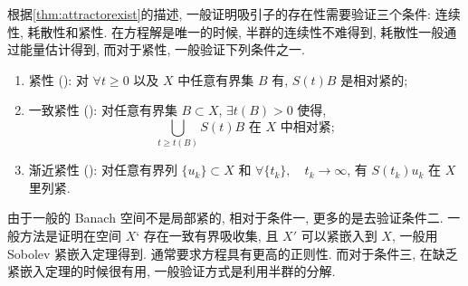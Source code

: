 \documentclass[oneside,longtitle]{LZUthesis}
\numberwithin{equation}{chapter}
\newcommand*\Brace[1]{\lbrace#1\rbrace}
\begin{document}
根据\cref{thm:attractorexist}的描述, 一般证明吸引子的存在性需要验证三个条件:
连续性, 耗散性和紧性. 在方程解是唯一的时候, 半群的连续性不难得到,
耗散性一般通过能量估计得到, 而对于紧性, 一般验证下列条件之一.
\begin{enumerate}[itemindent = -1em]
	\item 紧性 (\citep{temamInfiniteDimensionalDynamicalSystems1997}): 对 $\forall t \geq 0$ 以及 $X$ 中任意有界集 $B$ 有, $S(t)B$ 是相对紧的;
	\item 一致紧性 (\citep{babinAttractorsEvolutionEquations1992a,robinsonInfiniteDimensionalDynamicalSystems2001a}): 对任意有界集 $B \subset X$, $\exists t(B) > 0$ 使得,
	\begin{equation*}
		\bigcup_{t \geq t(B)} S(t)B \text{ 在 } X \text{ 中相对紧};
	\end{equation*}
	\item 渐近紧性 (\citep{ladyzhenskayaAttractorsSemigroupsEvolution1991}): 对任意有界列 $\Brace{u_k} \subset X$ 和
	$\forall \Brace{t_k}, \quad t_k \to \infty$, 有 $S(t_k)u_k$ 在 $X$ 里列紧.
\end{enumerate}

由于一般的 Banach 空间不是局部紧的, 相对于条件一, 更多的是去验证条件二.
一般方法是证明在空间 $X‘$ 存在一致有界吸收集, 且 $X'$ 可以紧嵌入到 $X$,
一般用 Sobolev 紧嵌入定理得到. 通常要求方程具有更高的正则性. 而对于条件三,
在缺乏紧嵌入定理的时候很有用, 一般验证方式是利用半群的分解.
\end{document}
